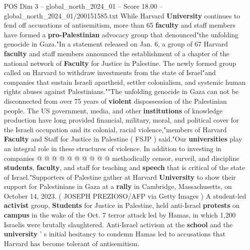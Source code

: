 \begin{textsample}{POS Dim 3 – global\_north\_2024\_01 – Score 18.00 – global\_north\_2024\_01/200151585.txt}  \label{ex:f3_pos_238}
While Harvard \textbf{University} continues to fend off accusations of antisemitism, more than 65 \textbf{faculty} and staff members have formed a \textbf{pro-Palestinian} advocacy group that denounced"the unfolding genocide in Gaza."In a statement released on Jan. 6, a group of 67 Harvard \textbf{faculty} and staff members announced the establishment of a chapter of the national network of \textbf{Faculty} for Justice in Palestine.
The newly formed group called on Harvard to withdraw investments from the state of Israel"and companies that sustain Israeli apartheid, settler colonialism, and systemic human rights abuses against Palestinians.""The unfolding genocide in Gaza can not be disconnected from over 75 years of \textbf{violent} dispossession of the Palestinian people.
The US government, media, and other \textbf{institutions} of knowledge production have long provided financial, military, moral, and political cover for the Israeli occupation and its colonial, racial violence,"members of Harvard \textbf{Faculty} and Staff for Justice in Palestine ( FSJP ) said."Our \textbf{universities} play an integral role in these structures of violence.
In addition to investing in companies @ @ @ @ @ @ @ @ @ @ methodically censor, surveil, and discipline \textbf{students}, \textbf{faculty}, and staff for teaching and \textbf{speech} that is critical of the state of Israel."Supporters of Palestine gather at Harvard \textbf{University} to show their support for Palestinians in Gaza at a \textbf{rally} in Cambridge, Massachusetts, on October 14, 2023. ( JOSEPH PREZIOSO/AFP via Getty Images ) A student-led \textbf{activist} group, \textbf{Students} for Justice in Palestine, held anti-Israel \textbf{protests} on \textbf{campus} in the wake of the Oct. 7 terror attack led by Hamas, in which 1,200 Israelis were brutally slaughtered.
Anti-Israel activism at the \textbf{school} and the \textbf{university} ' s initial hesitancy to condemn Hamas led to accusations that Harvard has become tolerant of antisemitism.

\end{textsample}
